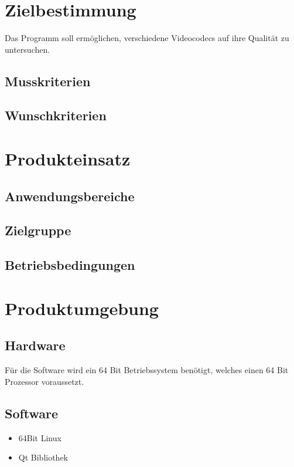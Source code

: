 \documentclass[parskip=full]{scrartcl}
\begin{document}
\maketitle
\thispagestyle{empty}
\newpage
\tableofcontents
\newpage
\section{Zielbestimmung}
Das Programm soll ermöglichen, verschiedene Videocodecs auf ihre Qualität zu untersuchen.
\subsection{Musskriterien}

\subsection{Wunschkriterien}

\section{Produkteinsatz}

\subsection{Anwendungsbereiche}

\subsection{Zielgruppe}

\subsection{Betriebsbedingungen}

\section{Produktumgebung}

\subsection{Hardware}
Für die Software wird ein 64 Bit Betriebssystem benötigt, welches einen 64 Bit Prozessor voraussetzt.

\subsection{Software}
\begin{itemize}
\item 64Bit Linux
\item Qt Bibliothek
\end{itemize}
\end{document}
